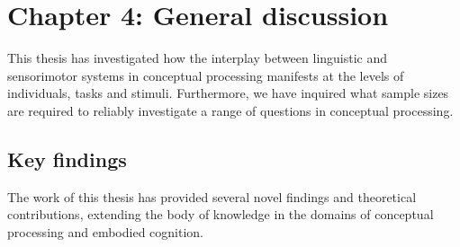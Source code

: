 \documentclass[
  12pt,
  man,floatsintext]{apa7}
\begin{document}
\clearpage

\hypertarget{chapter-4-general-discussion}{%
\section{Chapter 4: General discussion}\label{chapter-4-general-discussion}}

This thesis has investigated how the interplay between linguistic and sensorimotor systems in conceptual processing manifests at the levels of individuals, tasks and stimuli. Furthermore, we have inquired what sample sizes are required to reliably investigate a range of questions in conceptual processing.

\hypertarget{key-findings}{%
\subsection{Key findings}\label{key-findings}}

The work of this thesis has provided several novel findings and theoretical contributions, extending the body of knowledge in the domains of conceptual processing and embodied cognition.
\end{document}
